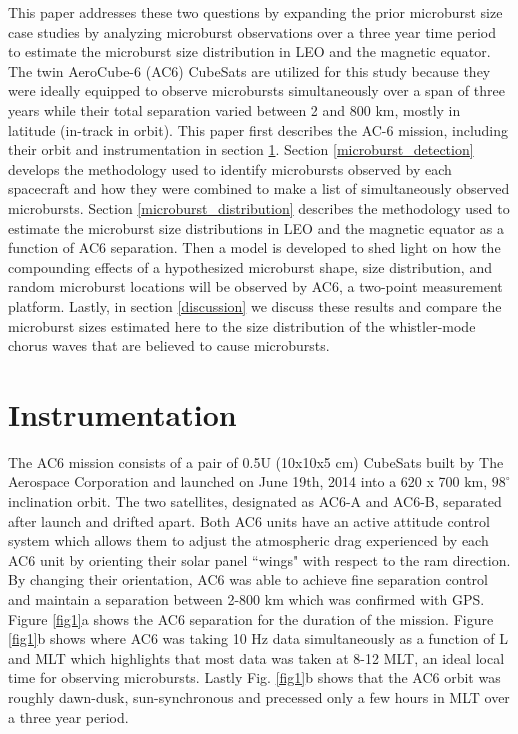 \documentclass[draft]{agujournal2019}
\begin{document}
This paper addresses these two questions by expanding the prior microburst size case studies by analyzing microburst observations over a three year time period to estimate the microburst size distribution in LEO and the magnetic equator. The twin AeroCube-6 (AC6) CubeSats are utilized for this study because they were ideally equipped to observe microbursts simultaneously over a span of three years while their total separation varied between 2 and 800 km, mostly in latitude (in-track in orbit). This paper first describes the AC-6 mission, including their orbit and instrumentation in section \ref{instrumentation}. Section \ref{microburst_detection} develops the methodology used to identify microbursts observed by each spacecraft and how they were combined to make a list of simultaneously observed microbursts. Section \ref{microburst_distribution} describes the methodology used to estimate the microburst size distributions in LEO and the magnetic equator as a function of AC6 separation. Then a model is developed to shed light on how the compounding effects of a hypothesized microburst shape, size distribution, and random microburst locations will be observed by AC6, a two-point measurement platform. Lastly, in section \ref{discussion} we discuss these results and compare the microburst sizes estimated here to the size distribution of the whistler-mode chorus waves that are believed to cause microbursts. 

\section{Instrumentation} \label{instrumentation}
The AC6 mission consists of a pair of 0.5U (10x10x5 cm) CubeSats built by The Aerospace Corporation and launched on June 19th, 2014 into a 620 x 700 km, $98^\circ$ inclination orbit. The two satellites, designated as AC6-A and AC6-B, separated after launch and drifted apart. Both AC6 units have an active attitude control system which allows them to adjust the atmospheric drag experienced by each AC6 unit by orienting their solar panel ``wings" with respect to the ram direction. By changing their orientation, AC6 was able to achieve fine separation control and maintain a separation between 2-800 km which was confirmed with GPS. Figure \ref{fig1}a shows the AC6 separation for the duration of the mission. Figure \ref{fig1}b shows where AC6 was taking 10 Hz data simultaneously as a function of L and MLT which highlights that most data was taken at 8-12 MLT, an ideal local time for observing microbursts. Lastly Fig. \ref{fig1}b shows that the AC6 orbit was roughly dawn-dusk, sun-synchronous and precessed only a few hours in MLT over a three year period.
\end{document}
